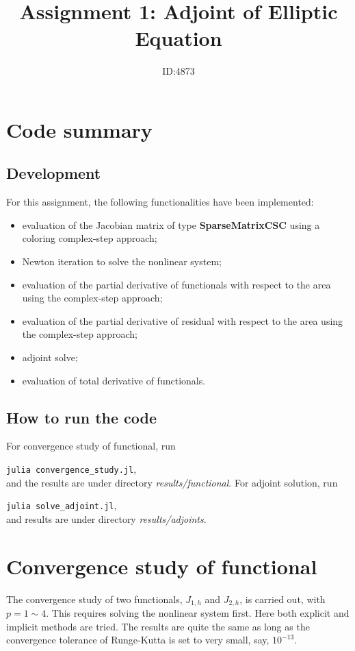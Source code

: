 \documentclass[a4paper]{article}
\title{Assignment 1: Adjoint of Elliptic Equation}
\author{ID:4873}
\begin{document}
 \maketitle
 
\begin{abstract}
  
\end{abstract}

\section{Code summary}
\subsection{Development}
For this assignment, the following functionalities have been implemented:
\begin{itemize}
  \item evaluation of the Jacobian matrix of type \textbf{SparseMatrixCSC} using a coloring complex-step approach;
  \item Newton iteration to solve the nonlinear system;
  \item evaluation of the partial derivative of functionals with respect to the area using the complex-step approach;
  \item evaluation of the partial derivative of residual with respect to the area using the complex-step approach;
  \item adjoint solve;
  \item evaluation of total derivative of functionals.
\end{itemize}
\subsection{How to run the code}
For convergence study of functional, run

\hspace{1cm}\texttt{julia convergence\_study.jl},\\ 
and the results are under directory \textit{results/functional}.
For adjoint solution, run
 
\hspace{1cm}\texttt{julia solve\_adjoint.jl}, \\
and results are under directory \textit{results/adjoints}.

\section{Convergence study of functional}
The convergence study of two functionals, $J_{1,h}$ and $J_{2,h}$, is carried out, with $p=1\sim4$. This requires solving the nonlinear system first. Here both explicit and implicit methods are tried. The results are quite the same as long as the convergence tolerance of Runge-Kutta is set to very small, say, $10^{-13}$. 
\end{document}
